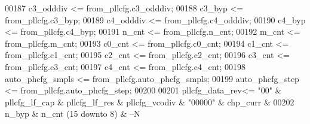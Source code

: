 \begin{DoxyCode}
00187 \textcolor{vhdlchar}{c3_odddiv}               \textcolor{vhdlchar}{<=} \textcolor{vhdlchar}{from_pllcfg}\textcolor{vhdlchar}{.}\textcolor{vhdlchar}{c3_odddiv};
00188 \textcolor{vhdlchar}{c3_byp}                  \textcolor{vhdlchar}{<=} \textcolor{vhdlchar}{from_pllcfg}\textcolor{vhdlchar}{.}\textcolor{vhdlchar}{c3_byp};
00189 \textcolor{vhdlchar}{c4_odddiv}               \textcolor{vhdlchar}{<=} \textcolor{vhdlchar}{from_pllcfg}\textcolor{vhdlchar}{.}\textcolor{vhdlchar}{c4_odddiv};
00190 \textcolor{vhdlchar}{c4_byp}                  \textcolor{vhdlchar}{<=} \textcolor{vhdlchar}{from_pllcfg}\textcolor{vhdlchar}{.}\textcolor{vhdlchar}{c4_byp};
00191 \textcolor{vhdlchar}{n_cnt}                   \textcolor{vhdlchar}{<=} \textcolor{vhdlchar}{from_pllcfg}\textcolor{vhdlchar}{.}\textcolor{vhdlchar}{n_cnt};
00192 \textcolor{vhdlchar}{m_cnt}                   \textcolor{vhdlchar}{<=} \textcolor{vhdlchar}{from_pllcfg}\textcolor{vhdlchar}{.}\textcolor{vhdlchar}{m_cnt};
00193 \textcolor{vhdlchar}{c0_cnt}                  \textcolor{vhdlchar}{<=} \textcolor{vhdlchar}{from_pllcfg}\textcolor{vhdlchar}{.}\textcolor{vhdlchar}{c0_cnt};
00194 \textcolor{vhdlchar}{c1_cnt}                  \textcolor{vhdlchar}{<=} \textcolor{vhdlchar}{from_pllcfg}\textcolor{vhdlchar}{.}\textcolor{vhdlchar}{c1_cnt};
00195 \textcolor{vhdlchar}{c2_cnt}                  \textcolor{vhdlchar}{<=} \textcolor{vhdlchar}{from_pllcfg}\textcolor{vhdlchar}{.}\textcolor{vhdlchar}{c2_cnt};
00196 \textcolor{vhdlchar}{c3_cnt}                  \textcolor{vhdlchar}{<=} \textcolor{vhdlchar}{from_pllcfg}\textcolor{vhdlchar}{.}\textcolor{vhdlchar}{c3_cnt};
00197 \textcolor{vhdlchar}{c4_cnt}                  \textcolor{vhdlchar}{<=} \textcolor{vhdlchar}{from_pllcfg}\textcolor{vhdlchar}{.}\textcolor{vhdlchar}{c4_cnt};
00198 \textcolor{vhdlchar}{auto_phcfg_smpls}        \textcolor{vhdlchar}{<=} \textcolor{vhdlchar}{from_pllcfg}\textcolor{vhdlchar}{.}\textcolor{vhdlchar}{auto_phcfg_smpls};
00199 \textcolor{vhdlchar}{auto_phcfg_step}         \textcolor{vhdlchar}{<=} \textcolor{vhdlchar}{from_pllcfg}\textcolor{vhdlchar}{.}\textcolor{vhdlchar}{auto_phcfg_step};
00200 
00201 \textcolor{vhdlchar}{pllcfg_data_rev}\textcolor{vhdlchar}{<=}         \textcolor{vhdllogic}{"00"} \textcolor{vhdlchar}{&} \textcolor{vhdlchar}{pllcfg_lf_cap} \textcolor{vhdlchar}{&} \textcolor{vhdlchar}{pllcfg_lf_res}  \textcolor{vhdlchar}{&} \textcolor{vhdlchar}{pllcfg_vcodiv}  \textcolor{vhdlchar}{&} \textcolor{vhdllogic}{"00000"} \textcolor{vhdlchar}{&} \textcolor{vhdlchar}{
      chp_curr} \textcolor{vhdlchar}{&}
00202                          \textcolor{vhdlchar}{n_byp}      \textcolor{vhdlchar}{&} \textcolor{vhdlchar}{n_cnt} \textcolor{vhdlchar}{(}\textcolor{vhdllogic}{}\textcolor{vhdllogic}{15}  \textcolor{keywordflow}{downto} \textcolor{vhdllogic}{}\textcolor{vhdllogic}{8}\textcolor{vhdlchar}{)} \textcolor{vhdlchar}{&}\textcolor{keyword}{ --N}

\end{DoxyCode}
